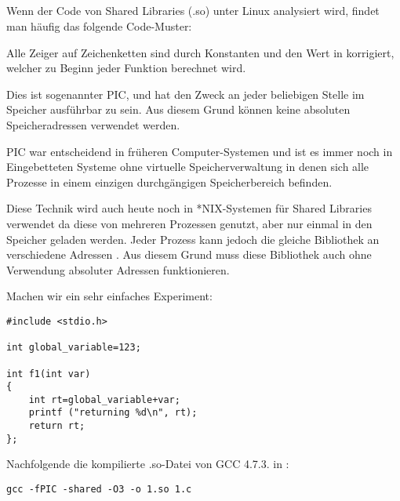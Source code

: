 \subsection{\CapitalPICcode}
\myindex{\PICcode}
\label{sec:PIC}

Wenn der Code von Shared Libraries (.so) unter Linux analysiert wird, findet
man häufig das folgende Code-Muster:



Alle Zeiger auf Zeichenketten sind durch Konstanten und den Wert in \EBX korrigiert,
welcher zu Beginn jeder Funktion berechnet wird.

Dies ist sogenannter \ac{PIC}, und hat den Zweck an jeder beliebigen Stelle im Speicher
ausführbar zu sein. Aus diesem Grund können keine absoluten Speicheradressen verwendet werden.

\ac{PIC} war entscheidend in früheren Computer-Systemen und ist es immer noch in Eingebetteten
Systeme ohne virtuelle Speicherverwaltung in denen sich alle Prozesse in einem einzigen durchgängigen
Speicherbereich befinden.

Diese Technik wird auch heute noch in *NIX-Systemen für Shared Libraries verwendet
da diese von mehreren Prozessen genutzt, aber nur einmal in den Speicher geladen werden.
Jeder Prozess kann jedoch die gleiche Bibliothek an verschiedene Adressen .
Aus diesem Grund muss diese Bibliothek auch ohne Verwendung absoluter Adressen funktionieren.

Machen wir ein sehr einfaches Experiment:

\begin{lstlisting}
#include <stdio.h>

int global_variable=123;

int f1(int var)
{
    int rt=global_variable+var;
    printf ("returning %d\n", rt);
    return rt;
};
\end{lstlisting}

Nachfolgende die kompilierte .so-Datei von GCC 4.7.3. in \IDA:

\begin{lstlisting}
gcc -fPIC -shared -O3 -o 1.so 1.c
\end{lstlisting}



\newcommand{\retstring}{\IT{<<returning \%d\textbackslash{}n>>}}
\newcommand{\globvar}{\IT{global\_variable}}

